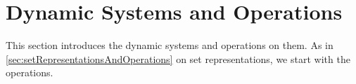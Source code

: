 \section{Dynamic Systems and Operations}

This section introduces the dynamic systems and operations on them. As in \cref{sec:setRepresentationsAndOperations} on set representations, we start with the operations.





